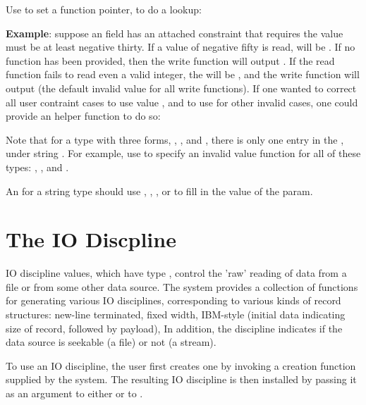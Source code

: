 Use  to set a function pointer,
 to do a lookup:


\textbf{Example}: suppose an  field has an attached constraint that requires the
value must be at least negative thirty.  If a value of negative fifty is read,  will be
. If no  function has been provided, then the
 write function will output .  If the read function fails to read even a
valid integer, the  will be , and the  write
function will output  (the default invalid value for all  write
functions). If one wanted to correct all user contraint cases to use value , and
to use  for other invalid cases, one could provide an 
helper function to do so:

%

Note that for a type  with three forms, , , and , there
is only one entry in the , under string
.  For example, use 
 to specify an invalid value function for all of these types: ,
, and .

An  for a string type should use , ,
, or  to fill in the value of the  param.


\section{The IO Discpline}
\label{sec:io-discipline}
IO discipline values, which have type , control the
'raw' reading of data from a file or from some other data source.  
The \pads{} system provides a collection of functions for generating
various IO disciplines, corresponding to various kinds of record
structures: new-line terminated, fixed width, IBM-style (initial data
indicating size of record, followed by payload), \etc{}  In addition,
the discipline indicates if the data source is seekable (a file) or
not (a stream).

To use an IO discipline, the user first creates one by invoking
a creation function supplied by the \pads{} system.  The resulting IO
discipline is then installed by passing it as an argument to either
 or to .

